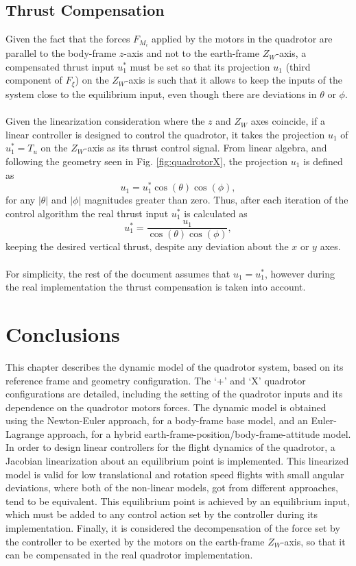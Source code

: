 \subsection{Thrust Compensation}
Given the fact that the forces $F_{M_i}$ applied by the motors in the quadrotor are parallel to the body-frame $z$-axis and not to the earth-frame $Z_W$-axis, a compensated thrust input $u_{1}^{*}$ must be set so that its projection $u_1$ (third component of $F_\xi$) on the $Z_W$-axis is such that it allows to keep the inputs of the system close to the equilibrium input, even though there are deviations in $\theta$ or $\phi$.
\\\\
Given the linearization consideration where the $z$ and $Z_W$ axes coincide, if a linear controller is designed to control the quadrotor, it takes the projection $u_{1}$ of $u_{1}^{*} = T_{u}$ on the $Z_W$-axis as its thrust control signal. From linear algebra, and following the geometry seen in Fig. \ref{fig:quadrotorX}, the projection $u_{1}$ is defined as
\begin{equation}
u_{1} = u_{1}^{*}\cos(\theta)\cos(\phi),
\end{equation}
for any $|\theta|$ and $|\phi|$ magnitudes greater than zero. Thus, after each iteration of the control algorithm the real thrust input $u_{1}^{*}$ is calculated as
\begin{equation}
u_{1}^{*} = \dfrac{u_{1}}{\cos(\theta)\cos(\phi)},
\end{equation}
keeping the desired vertical thrust, despite any deviation about the $x$ or $y$ axes. 
\\\\For simplicity, the rest of the document assumes that $u_1 = u_{1}^{*}$, however during the real implementation the thrust compensation is taken into account.
\section{Conclusions}
This chapter describes the dynamic model of the quadrotor system, based on its reference frame and geometry configuration. The `+' and `X' quadrotor configurations are detailed, including the setting of the quadrotor inputs and its dependence on the quadrotor motors forces. The dynamic model is obtained using the Newton-Euler approach, for a body-frame base model, and an Euler-Lagrange approach, for a hybrid earth-frame-position/body-frame-attitude model. In order to design linear controllers for the flight dynamics of the quadrotor, a Jacobian linearization about an equilibrium point is implemented. This linearized model is valid for low translational and rotation speed flights with small angular deviations, where both of the non-linear models, got from different approaches, tend to be equivalent. This equilibrium point is achieved by an equilibrium input, which must be added to any control action set by the controller during its implementation.  Finally, it is considered the decompensation of the force set by the controller to be exerted by the motors on the earth-frame $Z_W$-axis, so that it can be compensated in the real quadrotor implementation.